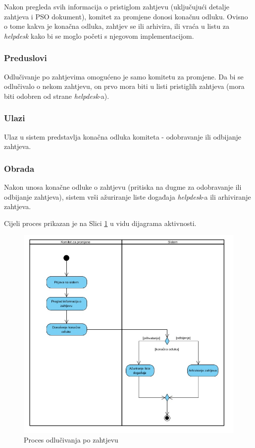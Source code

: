 \documentclass[12pt,a4paper]{article}
\begin{document}
Nakon pregleda svih informacija o pristiglom zahtjevu (uključujući detalje zahtjeva i PSO dokument), komitet za promjene donosi konačnu odluku. Ovisno o tome kakva je konačna odluka, zahtjev se ili arhivira, ili vraća u listu za \textit{helpdesk} kako bi se moglo početi s njegovom implementacijom.

\subsubsection{Preduslovi}

Odlučivanje po zahtjevima omogućeno je samo komitetu za promjene. Da bi se odlučivalo o nekom zahtjevu, on prvo mora biti u listi pristiglih zahtjeva (mora biti odobren od strane \textit{helpdesk}-a).

\subsubsection{Ulazi}

Ulaz u sistem predstavlja konačna odluka komiteta - odobravanje ili odbijanje zahtjeva.

\subsubsection{Obrada}

Nakon unosa konačne odluke o zahtjevu (pritiska na dugme za odobravanje ili odbijanje zahtjeva), sistem vrši ažuriranje liste događaja \textit{helpdesk}-a ili arhiviranje zahtjeva.

Cijeli proces prikazan je na Slici \ref{act8} u vidu dijagrama aktivnosti.

\begin{figure}[H]
\center
\includegraphics[scale=0.5]{../res/Activity/activity8.JPG}
\caption{Proces odlučivanja po zahtjevu}
\label{act8}
\end{figure}
\end{document}
